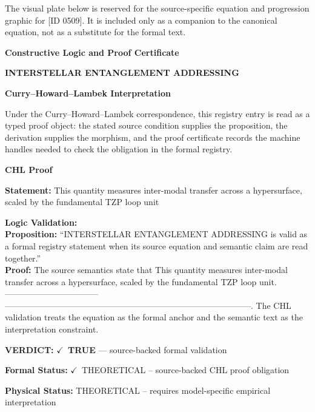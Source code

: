 \begingroup\footnotesize\sloppy
The visual plate below is reserved for the source-specific equation and progression graphic for [ID 0509]. It is included only as a companion to the canonical equation, not as a substitute for the formal text.
\par\endgroup
\ifTZPDarkEdition
{}
\fi

\clearpage
\begingroup\tzpsupportsetup
\noindent\textbf{\fontsize{10.8pt}{12.8pt}\selectfont [ID 0509] Constructive Logic and Proof Certificate}\par
\noindent\textbf{\fontsize{10pt}{12pt}\selectfont INTERSTELLAR ENTANGLEMENT ADDRESSING}\par
\vspace{0.45em}
\begingroup
\footnotesize
\setlength{\parskip}{0.22em}
\setlength{\parindent}{0pt}
\noindent\textbf{Curry--Howard--Lambek Interpretation}\par
Under the Curry--Howard--Lambek correspondence, this registry entry is read as a typed proof
object: the stated source condition supplies the proposition, the derivation supplies the
morphism, and the proof certificate records the machine handles needed to check the obligation
in the formal registry.

\vspace{0.45em}
\noindent\textbf{CHL Proof}\par
\textbf{Statement:} This quantity measures inter-modal transfer across a hypersurface, scaled by the
fundamental TZP loop unit

\textbf{Logic Validation:}\\
\textbf{Proposition:} ``INTERSTELLAR ENTANGLEMENT ADDRESSING is valid as a formal registry statement when its
source equation and semantic claim are read together.''\\
\textbf{Proof:} The source semantics state that This quantity measures inter-modal transfer across a
hypersurface, scaled by the fundamental TZP loop unit. ---------------------------------
---------------------------------------------------------------------------------------.
The CHL validation treats the equation as the formal anchor and the semantic text as the
interpretation constraint.

\textbf{VERDICT:} \ensuremath{\checkmark}\ \textbf{TRUE} --- source-backed formal validation

\textbf{Formal Status:} \ensuremath{\checkmark}\ THEORETICAL -- source-backed CHL proof obligation

\textbf{Physical Status:} THEORETICAL -- requires model-specific empirical interpretation
\par\vspace{0.45em}
\par
\ifTZPDarkEdition
{}
\fi
\endgroup
\endgroup
